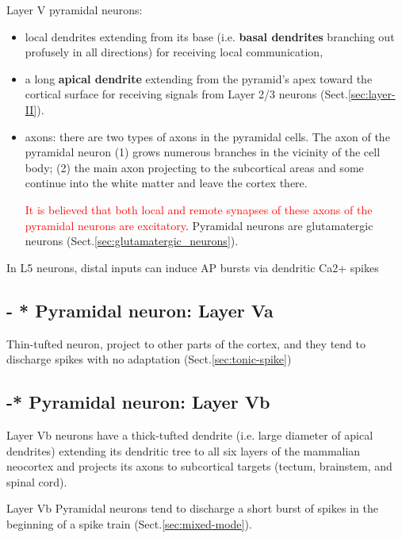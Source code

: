Layer V pyramidal neurons:
\begin{itemize}
  \item local dendrites extending from its base (i.e. {\bf basal dendrites}
  branching out profusely in all directions) for receiving local communication,

   \item a long {\bf apical dendrite} extending from the pyramid's apex toward
   the cortical surface for receiving signals from Layer 2/3 neurons
   (Sect.\ref{sec:layer-II}).
   
  \item axons: there are two types of axons in the pyramidal cells. The axon of
  the pyramidal neuron (1) grows numerous branches in the vicinity of the cell
  body; (2) the main axon projecting to the subcortical areas and some
  continue into the white matter and leave the cortex there.

\textcolor{red}{It is believed that both local and remote synapses of these
axons of the pyramidal neurons are excitatory}. Pyramidal neurons are
glutamatergic neurons (Sect.\ref{sec:glutamatergic_neurons}).

\end{itemize}


In L5 neurons, distal inputs can induce AP bursts via dendritic Ca2+ spikes

\subsection{- * Pyramidal neuron: Layer Va}
\label{sec:pyramidal-neuron-layer-Va}

Thin-tufted neuron, project to other parts of the cortex, and they tend to
discharge  spikes with no adaptation (Sect.\ref{sec:tonic-spike})
    
    
\subsection{ -* Pyramidal neuron: Layer Vb}
\label{sec:pyramidal-neuron-layer-Vb}

Layer Vb neurons have a thick-tufted dendrite (i.e. large diameter of apical
dendrites) extending its dendritic tree to all six layers of the mammalian
neocortex and projects its axons to subcortical targets (tectum, brainstem, and
spinal cord).

Layer Vb Pyramidal neurons tend to discharge a short burst of spikes in the
beginning of a spike train (Sect.\ref{sec:mixed-mode}).

